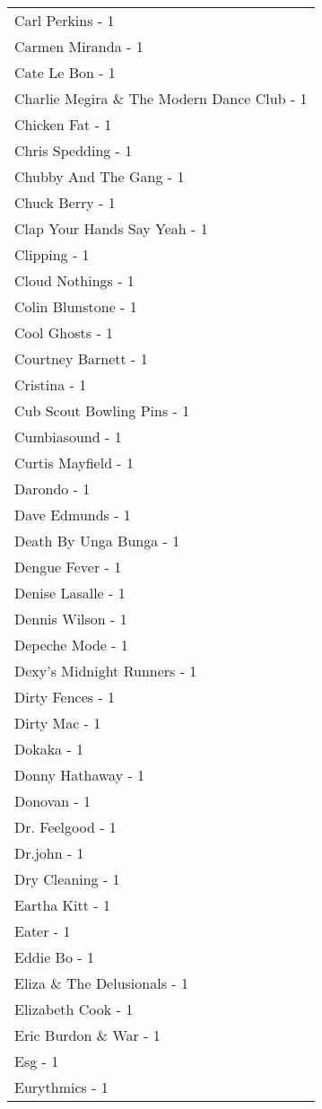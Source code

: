 \documentclass[
]{article}
\begin{document}
\begin{longtable}{l}
Carl Perkins - 1 \\ 
Carmen Miranda - 1 \\ 
Cate Le Bon - 1 \\ 
Charlie Megira \& The Modern Dance Club - 1 \\ 
Chicken Fat - 1 \\ 
Chris Spedding - 1 \\ 
Chubby And The Gang - 1 \\ 
Chuck Berry - 1 \\ 
Clap Your Hands Say Yeah - 1 \\ 
Clipping - 1 \\ 
Cloud Nothings - 1 \\ 
Colin Blunstone - 1 \\ 
Cool Ghosts - 1 \\ 
Courtney Barnett - 1 \\ 
Cristina - 1 \\ 
Cub Scout Bowling Pins - 1 \\ 
Cumbiasound - 1 \\ 
Curtis Mayfield - 1 \\ 
Darondo - 1 \\ 
Dave Edmunds - 1 \\ 
Death By Unga Bunga - 1 \\ 
Dengue Fever - 1 \\ 
Denise Lasalle - 1 \\ 
Dennis Wilson - 1 \\ 
Depeche Mode - 1 \\ 
Dexy's Midnight Runners - 1 \\ 
Dirty Fences - 1 \\ 
Dirty Mac - 1 \\ 
Dokaka - 1 \\ 
Donny Hathaway - 1 \\ 
Donovan - 1 \\ 
Dr. Feelgood - 1 \\ 
Dr.john - 1 \\ 
Dry Cleaning - 1 \\ 
Eartha Kitt - 1 \\ 
Eater - 1 \\ 
Eddie Bo - 1 \\ 
Eliza \& The Delusionals - 1 \\ 
Elizabeth Cook - 1 \\ 
Eric Burdon \& War - 1 \\ 
Esg - 1 \\ 
Eurythmics - 1 \\ 

\end{longtable}
\end{document}
